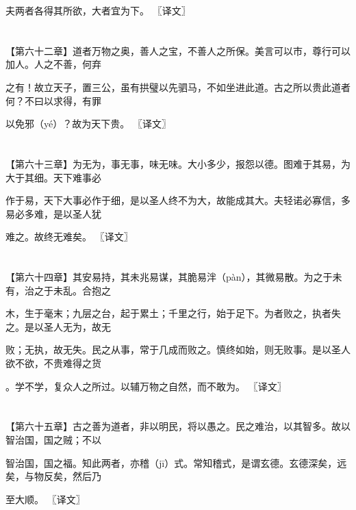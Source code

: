 \documentclass[a4paper,12pt,UTF8,twoside]{ctexbook}
\begin{document}
	夫两者各得其所欲，大者宜为下。 〖译文〗
	
	\chapter{}	
	
	【第六十二章】道者万物之奥，善人之宝，不善人之所保。美言可以市，尊行可以加人。人之不善，何弃
	
	之有！故立天子，置三公，虽有拱璧以先驷马，不如坐进此道。古之所以贵此道者何？不曰以求得，有罪
	
	以免邪（yé）？故为天下贵。 〖译文〗
	
	\chapter{}	
	
	【第六十三章】为无为，事无事，味无味。大小多少，报怨以德。图难于其易，为大于其细。天下难事必
	
	作于易，天下大事必作于细，是以圣人终不为大，故能成其大。夫轻诺必寡信，多易必多难，是以圣人犹
	
	难之。故终无难矣。 〖译文〗
	
	\chapter{}	
	
	【第六十四章】其安易持，其未兆易谋，其脆易泮（pàn），其微易散。为之于未有，治之于未乱。合抱之
	
	木，生于毫末；九层之台，起于累土；千里之行，始于足下。为者败之，执者失之。是以圣人无为，故无
	
	败；无执，故无失。民之从事，常于几成而败之。慎终如始，则无败事。是以圣人欲不欲，不贵难得之货
	
	。学不学，复众人之所过。以辅万物之自然，而不敢为。 〖译文〗
	
	\chapter{}	
	
	【第六十五章】古之善为道者，非以明民，将以愚之。民之难治，以其智多。故以智治国，国之贼；不以
	
	智治国，国之福。知此两者，亦稽（jī）式。常知稽式，是谓玄德。玄德深矣，远矣，与物反矣，然后乃
	
	至大顺。 〖译文〗
	
	\chapter{}	
	
\end{document}
